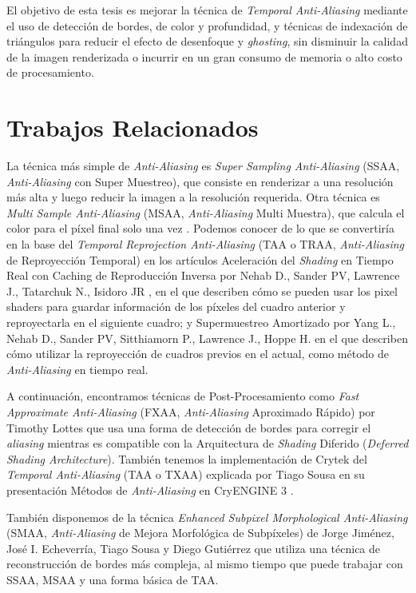 \documentclass[pregrado]{tesis-usb} %
\begin{document}
El objetivo de esta tesis es mejorar la técnica de \textit{Temporal Anti-Aliasing} mediante el uso de detección de bordes, de color y profundidad, y técnicas de indexación de triángulos para reducir el efecto de desenfoque y \textit{ghosting}, sin disminuir la calidad de la imagen renderizada o incurrir en un gran consumo de memoria o alto costo de procesamiento.


\section{Trabajos Relacionados}
La técnica más simple de \textit{Anti-Aliasing} es \textit{Super Sampling Anti-Aliasing} (SSAA, \textit{Anti-Aliasing} con Super Muestreo), que consiste en renderizar a una resolución más alta y luego reducir la imagen a la resolución requerida. Otra técnica es \textit{Multi Sample Anti-Aliasing} (MSAA, \textit{Anti-Aliasing} Multi Muestra), que calcula el color para el píxel final solo una vez \cite{Doggett2017EDAN35}. Podemos conocer de lo que se convertiría en la base del \textit{Temporal Reprojection Anti-Aliasing}  (TAA o TRAA, \textit{Anti-Aliasing} de Reproyección Temporal) en los artículos Aceleración del \textit{Shading} en Tiempo Real con Caching de Reproducción Inversa por Nehab D., Sander PV, Lawrence J., Tatarchuk N., Isidoro JR \cite{Nehab2007}, en el que describen cómo se pueden usar los pixel shaders para guardar información de los píxeles del cuadro anterior y reproyectarla en el siguiente cuadro; y Supermuestreo Amortizado por Yang L., Nehab D., Sander PV, Sitthiamorn P., Lawrence J., Hoppe H. \cite{Yang2009} en el que describen cómo utilizar la reproyección de cuadros previos  en el actual, como método de \textit{Anti-Aliasing} en tiempo real.

A continuación, encontramos técnicas de Post-Procesamiento como \textit{Fast Approximate Anti-Aliasing} (FXAA, \textit{Anti-Aliasing} Aproximado Rápido) por Timothy Lottes \cite{Lottes2009} que usa una forma de detección de bordes para corregir el \textit{aliasing} mientras es compatible con la Arquitectura de \textit{Shading} Diferido (\textit{Deferred Shading Architecture}). También tenemos la implementación de Crytek del \textit{Temporal Anti-Aliasing} (TAA o TXAA) explicada por Tiago Sousa en su presentación Métodos de \textit{Anti-Aliasing} en CryENGINE 3 \cite{JIMENEZ2011_SIGGRAPH11}.

También disponemos de la técnica \textit{Enhanced Subpixel Morphological Anti-Aliasing} (SMAA, \textit{Anti-Aliasing} de Mejora Morfológica de Subpíxeles) de Jorge Jiménez, José I. Echeverría, Tiago Sousa y Diego Gutiérrez \cite{Jimenez2012} que utiliza una técnica de reconstrucción de bordes más compleja, al mismo tiempo que puede trabajar con SSAA, MSAA y una forma básica de TAA.
\end{document}
